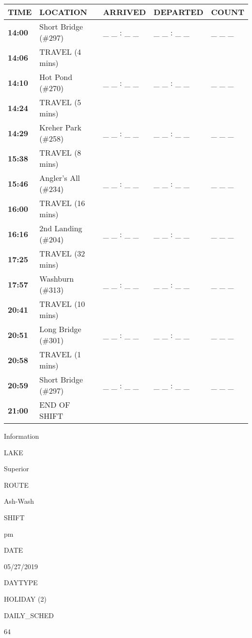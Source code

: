 \documentclass[]{article}
\begin{document}
\begin{tabular}{>{\bfseries}lllll}
\toprule
\textbf{TIME} & \textbf{LOCATION} & \textbf{ARRIVED} & \textbf{DEPARTED} & \textbf{COUNT}\\
\midrule
14:00 & Short Bridge (\#297) & \_ \_ : \_ \_ & \_ \_ : \_ \_ & \_ \_ \_\\
14:06 & TRAVEL (4 mins) &  &  & \\
14:10 & Hot Pond (\#270) & \_ \_ : \_ \_ & \_ \_ : \_ \_ & \_ \_ \_\\
14:24 & TRAVEL (5 mins) &  &  & \\
14:29 & Kreher Park (\#258) & \_ \_ : \_ \_ & \_ \_ : \_ \_ & \_ \_ \_\\
15:38 & TRAVEL (8 mins) &  &  & \\
15:46 & Angler's All (\#234) & \_ \_ : \_ \_ & \_ \_ : \_ \_ & \_ \_ \_\\
16:00 & TRAVEL (16 mins) &  &  & \\
16:16 & 2nd Landing (\#204) & \_ \_ : \_ \_ & \_ \_ : \_ \_ & \_ \_ \_\\
17:25 & TRAVEL (32 mins) &  &  & \\
17:57 & Washburn (\#313) & \_ \_ : \_ \_ & \_ \_ : \_ \_ & \_ \_ \_\\
20:41 & TRAVEL (10 mins) &  &  & \\
20:51 & Long Bridge (\#301) & \_ \_ : \_ \_ & \_ \_ : \_ \_ & \_ \_ \_\\
20:58 & TRAVEL (1 mins) &  &  & \\
20:59 & Short Bridge (\#297) & \_ \_ : \_ \_ & \_ \_ : \_ \_ & \_ \_ \_\\
21:00 & END OF SHIFT &  &  & \\
\bottomrule
\end{tabular}\newpage

Information

LAKE

Superior

ROUTE

Ash-Wash

SHIFT

pm

DATE

05/27/2019

DAYTYPE

HOLIDAY (2)

DAILY\_SCHED

64

\vspace{24pt}
\end{document}
